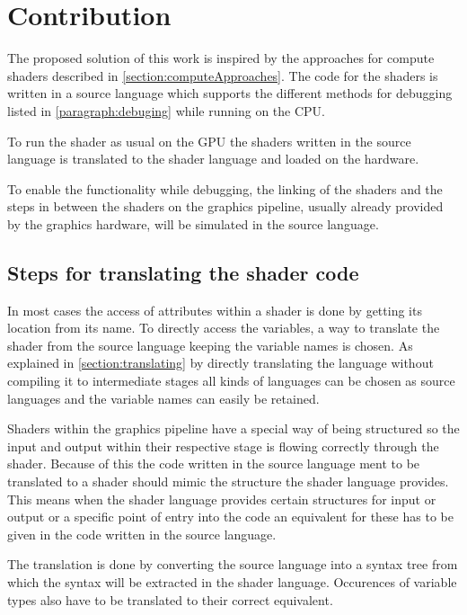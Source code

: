 

\chapter{Contribution}\label{cha:Contribution}

The proposed solution of this work is inspired by the approaches for compute shaders described in \autoref{section:computeApproaches}. The code for the shaders is written in a source language which supports the different methods for debugging listed in \autoref{paragraph:debuging} while running on the CPU.

To run the shader as usual on the GPU the shaders written in the source language is translated to the shader language and loaded on the hardware.

To enable the functionality while debugging, the linking of the shaders and the steps in between the shaders on the graphics pipeline, usually already provided by the graphics hardware, will be simulated in the source language.

\section{Steps for translating the shader code}
\label{section:contribution_translating}

In most cases the access of attributes within a shader is done by getting its location from its name. To directly access the variables, a way to translate the shader from the source language keeping the variable names is chosen. As explained in \autoref{section:translating} by directly translating the language without compiling it to intermediate stages all kinds of languages can be chosen as source languages and the variable names can easily be retained.

Shaders within the graphics pipeline have a special way of being structured so the input and output within their respective stage is flowing correctly through the shader. Because of this the code written in the source language ment to be translated to a shader should mimic the structure the shader language provides. This means when the shader language provides certain structures for input or output or a specific point of entry into the code an equivalent for these has to be given in the code written in the source language.

The translation is done by converting the source language into a syntax tree from which the syntax will be extracted in the shader language. Occurences of variable types also have to be translated to their correct equivalent.

